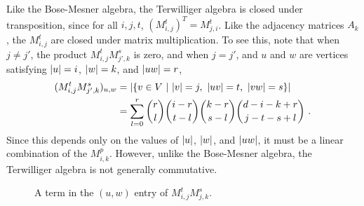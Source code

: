 \documentclass{report}
\newcommand{\wt}[1]{\abs{ #1 }}
\newcommand{\Mijt}{M_{i, j}^t}
\begin{document}
    Like the Bose-Mesner algebra, the Terwilliger algebra is closed under
    transposition, since for all $i, j, t$, $(\Mijt)^T = M_{j, i}^t$.  Like the
    adjacency matrices $A_k$, the $\Mijt$ are closed under matrix
    multiplication.  To see this, note that when $j \neq j'$, the product $\Mijt
    M_{j', k}^s$ is zero, and when $j = j'$, and $u$ and $w$ are vertices
    satisfying $\wt{u} = i$, $\wt{w} = k$, and $\wt{uw} = r$,
    \begin{alignat*}{2}
      (\Mijt M_{j', k}^s)_{u, w} &=
        \abs{\buildset{v \in V}{\wt{v} = j,\ \wt{uv} = t,\ \wt{vw} = s}} \\
      &= \sum_{l=0}^r \binom{r}{l} \binom{i-r}{t-l} \binom{k-r}{s-l}
        \binom{d-i-k+r}{j-t-s+l} \ .
    \end{alignat*}
    Since this depends only on the values of $\wt{u}$, $\wt{w}$, and $\wt{uw}$,
    it must be a linear combination of the $M_{i, k}^p$.  However, unlike the
    Bose-Mesner algebra, the Terwilliger algebra is not generally commutative.

    \begin{figure}[h]
      \centering
      \caption{
        A term in the $(u, w)$ entry of $\Mijt M_{j, k}^s$.
      }
    \end{figure}
\end{document}
